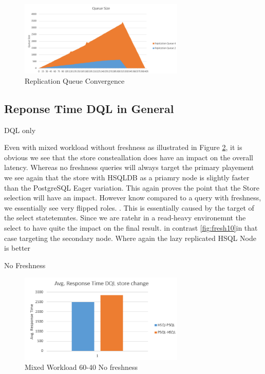 \begin{figure}[t] 
    \centering 
    \includegraphics[width=0.7\textwidth]{Figures/queuesize24.PNG}
    \caption{Replication Queue Convergence}
    \label{fig:converge24}
\end{figure}









\subsection*{Reponse Time DQL in General}

DQL only

Even with mixed workload without freshness as illustrated in Figure \ref{fig:dqldml_no_fresh}, it is obvious 
we see that the store consteallation does have an impact on the overall latency.
Whereas no freshness queries will always target the primary playement we see
again that the store with HSQLDB as a priamry node is slightly faster than the PostgreSQL Eager variation. This again proves the
point that the Store selection will have an impact.
However know compared to a query with freshness, we essentially see very flipped roles.
. This is essentially caused by the target of the select statetemntes. Since we are ratehr in a 
read-heavy environemnt the select to have quite the impact on the final result.
in contrast \ref{fig:fresh10}in that case targeting the secondary node. Where again the lazy replicated HSQL Node is better

No Freshness 
\begin{figure}[t] 
    \centering 
    \includegraphics[width=0.7\textwidth]{Figures/avg_response-hsql-psql-dql_no_fresg.PNG}
    \caption{Mixed Workload 60-40 No freshness}
    \label{fig:dqldml_no_fresh}
\end{figure}


